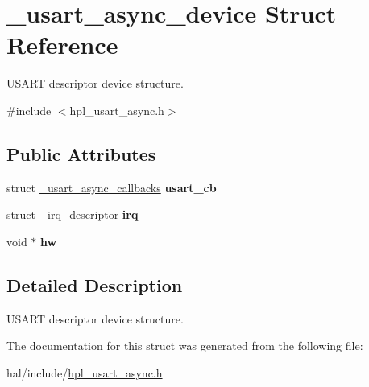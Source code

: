 \hypertarget{struct__usart__async__device}{}\section{\+\_\+usart\+\_\+async\+\_\+device Struct Reference}
\label{struct__usart__async__device}


U\+S\+A\+RT descriptor device structure.  




{\ttfamily \#include $<$hpl\+\_\+usart\+\_\+async.\+h$>$}

\subsection*{Public Attributes}
\begin{DoxyCompactItemize}
\item 
\mbox{\label{struct__usart__async__device_af36f1abd8113ed4a2f06a9084519f369}} 
struct \hyperlink{struct__usart__async__callbacks}{\+\_\+usart\+\_\+async\+\_\+callbacks} {\bfseries usart\+\_\+cb}
\item 
\mbox{\label{struct__usart__async__device_a0eb2cf8aa3661fe0a22168429c04bf57}} 
struct \hyperlink{struct__irq__descriptor}{\+\_\+irq\+\_\+descriptor} {\bfseries irq}
\item 
\mbox{\label{struct__usart__async__device_a3eae9af22755ddfe25f8406c2939262f}} 
void $\ast$ {\bfseries hw}
\end{DoxyCompactItemize}


\subsection{Detailed Description}
U\+S\+A\+RT descriptor device structure. 

The documentation for this struct was generated from the following file\+:\begin{DoxyCompactItemize}
\item 
hal/include/\hyperlink{hpl__usart__async_8h}{hpl\+\_\+usart\+\_\+async.\+h}\end{DoxyCompactItemize}
